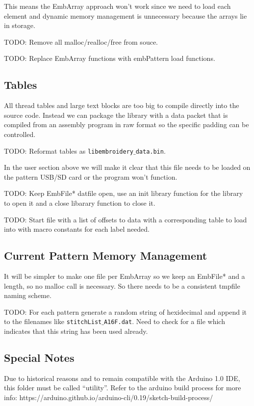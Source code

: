 \documentclass[onesize, a4paper]{refart}
\begin{document}
This means the EmbArray approach won't work since we need to load
each element and dynamic memory management is unnecessary because
the arrays lie in storage.

TODO: Remove all malloc/realloc/free from souce.

TODO: Replace EmbArray functions with embPattern load functions.

\subsection{Tables}

All thread tables and large text blocks are too big to compile directly
into the source code. Instead we can package the library with a data packet
that is compiled from an assembly program in raw format so the specific
padding can be controlled.

TODO: Reformat tables as \texttt{libembroidery$\_$data.bin}.

In the user section above we will make it clear that this file
needs to be loaded on the pattern USB/SD card or the program won't function.

TODO: Keep EmbFile* datfile open, use an init library function for the library
to open it and a close libarary function to close it.

TODO: Start file with a list of offsets to data with a corresponding table
to load into with macro constants for each label needed.

\subsection{Current Pattern Memory Management}

It will be simpler to make one file per EmbArray so we keep an EmbFile*
and a length, so no malloc call is necessary. So there needs to be a consistent
tmpfile naming scheme.

TODO: For each pattern generate a random string of hexidecimal and append it
to the filenames like \texttt{stitchList$\_$A16F.dat}. Need to check for a file
which indicates that this string has been used already.

\subsection{Special Notes}

Due to historical reasons and to remain compatible with the Arduino 1.0
IDE, this folder must be called ``utility''. Refer to the arduino build
process for more info:
https://arduino.github.io/arduino-cli/0.19/sketch-build-process/
\end{document}
